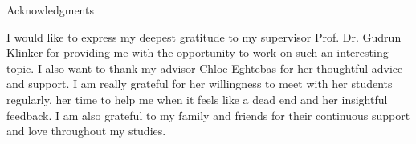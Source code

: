 \thispagestyle{empty}

\vspace*{20mm}

\begin{center}
    { Acknowledgments}
\end{center}

\vspace{10mm}

I would like to express my deepest gratitude to my supervisor Prof. Dr. Gudrun Klinker for providing me with the opportunity to work on such an interesting topic. 
I also want to thank my advisor Chloe Eghtebas for her thoughtful advice and support. 
I am really grateful for her willingness to meet with her students regularly, her time to help me 
when it feels like a dead end and her insightful feedback. 
I am also grateful to my family and friends for their continuous support and love throughout my studies.

\cleardoublepage{}
